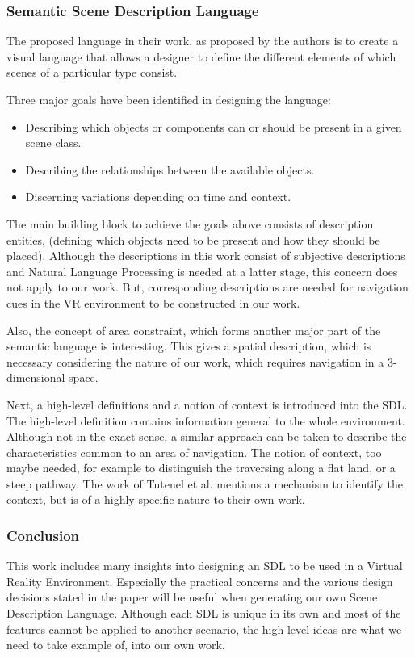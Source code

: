 \subsubsection{Semantic Scene Description Language}
The proposed language in their work, as proposed by the authors is to create a visual language that allows a designer to define the different elements of which scenes of a particular type consist.

Three major goals have been identified in designing the language:
\begin{itemize}
\item{Describing which objects or components can or should be present in a given scene class.}
\item{Describing the relationships between the available objects.}
\item{Discerning variations depending on time and context.}
\end{itemize}

The main building block to achieve the goals above consists of description entities, (defining which objects need to be present and how they should be placed). Although the descriptions in this work consist of subjective descriptions and Natural Language Processing is needed at a latter stage, this concern does not apply to our work. But, corresponding descriptions are needed for navigation cues in the VR environment to be constructed in our work.

Also, the concept of area constraint, which forms another major part of the semantic language is interesting. This gives a spatial description, which is necessary considering the nature of our work, which requires navigation in a 3-dimensional space.

Next, a high-level definitions and a notion of context is introduced into the SDL. The high-level definition contains information general to the whole environment. Although not in the exact sense, a similar approach can be taken to describe the characteristics common to an area of navigation. The notion of context, too maybe needed, for example to distinguish the traversing along a flat land, or a steep pathway. The work of Tutenel et al. mentions a mechanism to identify the context, but is of a highly specific nature to their own work.

\subsubsection{Conclusion}
This work includes many insights into designing an SDL to be used in a Virtual Reality Environment. Especially the practical concerns and the various design decisions stated in the paper will be useful when generating our own Scene Description Language. Although each SDL is unique in its own and most of the features cannot be applied to another scenario, the high-level ideas are what we need to take example of, into our own work.

